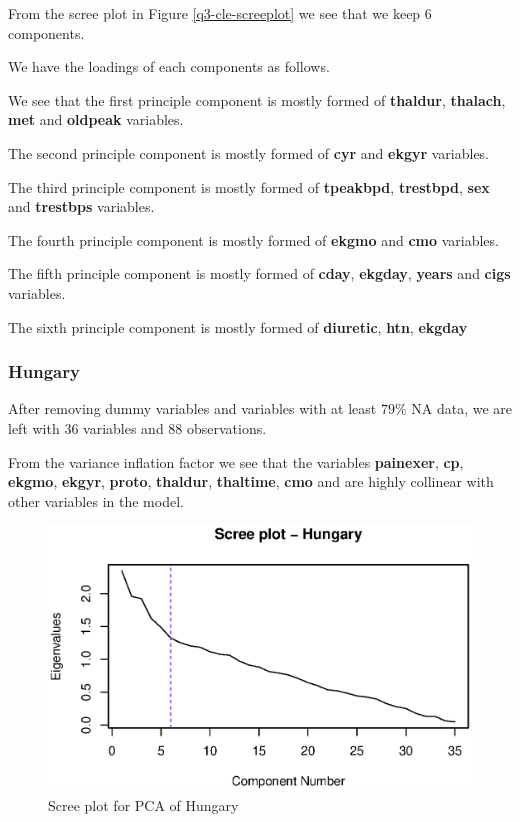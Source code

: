 \documentclass[a4paper]{article}
\begin{document}
From the scree plot in Figure \ref{q3-cle-screeplot} we see that we keep 6
components.

We have the loadings of each components as follows.



We see that the first principle component is mostly formed of \textbf{thaldur},
\textbf{thalach}, \textbf{met} and \textbf{oldpeak} variables.

The second principle component is mostly formed of \textbf{cyr} and
\textbf{ekgyr} variables.

The third principle component is mostly formed of \textbf{tpeakbpd},
\textbf{trestbpd}, \textbf{sex} and \textbf{trestbps} variables.

The fourth principle component is mostly formed of \textbf{ekgmo} and
\textbf{cmo} variables.

The fifth principle component is mostly formed of \textbf{cday},
\textbf{ekgday}, \textbf{years} and \textbf{cigs} variables.

The sixth principle component is mostly formed of \textbf{diuretic},
\textbf{htn}, \textbf{ekgday}

\subsubsection{Hungary}

After removing dummy variables and variables with at least $79\%$ NA data, we
are left with 36 variables and 88 observations.



From the variance inflation factor we see that the variables \textbf{painexer},
\textbf{cp}, \textbf{ekgmo}, \textbf{ekgyr}, \textbf{proto}, \textbf{thaldur},
\textbf{thaltime}, \textbf{cmo} and  are highly collinear with other
variables in the model.

\begin{figure}[H]
	\begin{center}
		\includegraphics[width=12cm]{question3output/hunscreeplot.eps}
	\end{center}
	\caption{Scree plot for PCA of Hungary}
	\label{q3-hun-screeplot}
\end{figure}
\end{document}
